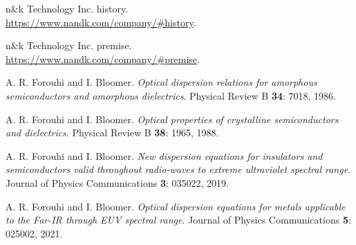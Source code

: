 \documentclass[pra,superscriptaddress,reprint]{revtex4-1}
\begin{document}
\begin{thebibliography}{99}

n\&k Technology Inc. history. \\
\url{https://www.nandk.com/company/#history}.

n\&k Technology Inc. premise. \\
\url{https://www.nandk.com/company/#premise}.


A. R. Forouhi and I. Bloomer.
\textit{Optical dispersion relations for amorphous semiconductors and amorphous dielectrics}.
Physical Review B \textbf{34}: 7018, 1986.

A. R. Forouhi and I. Bloomer.
\textit{Optical properties of crystalline semiconductors and dielectrics}.
Physical Review B \textbf{38}: 1965, 1988.

A. R. Forouhi and I. Bloomer.
\textit{New dispersion equations for insulators and semiconductors valid
throughout radio-waves to extreme ultraviolet spectral range}.
Journal of Physics Communications \textbf{3}: 035022, 2019.

A. R. Forouhi and I. Bloomer.
\textit{Optical dispersion equations for metals applicable to the Far-IR
through EUV spectral range}.
Journal of Physics Communications \textbf{5}: 025002, 2021.


\end{thebibliography}
\end{document}
